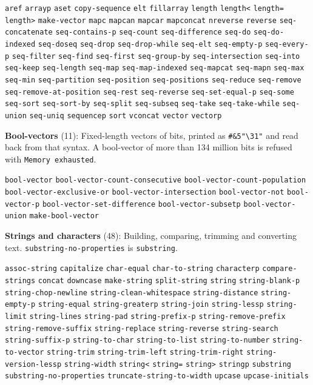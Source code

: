 \documentclass[11pt]{article}
\begin{document}
\texttt{aref} \texttt{arrayp} \texttt{aset} \texttt{copy-sequence} \texttt{elt} \texttt{fillarray} \texttt{length} \texttt{length<} \texttt{length=} \texttt{length>} \texttt{make-vector} \texttt{mapc} \texttt{mapcan} \texttt{mapcar} \texttt{mapconcat} \texttt{nreverse} \texttt{reverse} \texttt{seq-concatenate} \texttt{seq-contains-p} \texttt{seq-count} \texttt{seq-difference} \texttt{seq-do} \texttt{seq-do-indexed} \texttt{seq-doseq} \texttt{seq-drop} \texttt{seq-drop-while} \texttt{seq-elt} \texttt{seq-empty-p} \texttt{seq-every-p} \texttt{seq-filter} \texttt{seq-find} \texttt{seq-first} \texttt{seq-group-by} \texttt{seq-intersection} \texttt{seq-into} \texttt{seq-keep} \texttt{seq-length} \texttt{seq-map} \texttt{seq-map-indexed} \texttt{seq-mapcat} \texttt{seq-mapn} \texttt{seq-max} \texttt{seq-min} \texttt{seq-partition} \texttt{seq-position} \texttt{seq-positions} \texttt{seq-reduce} \texttt{seq-remove} \texttt{seq-remove-at-position} \texttt{seq-rest} \texttt{seq-reverse} \texttt{seq-set-equal-p} \texttt{seq-some} \texttt{seq-sort} \texttt{seq-sort-by} \texttt{seq-split} \texttt{seq-subseq} \texttt{seq-take} \texttt{seq-take-while} \texttt{seq-union} \texttt{seq-uniq} \texttt{sequencep} \texttt{sort} \texttt{vconcat} \texttt{vector} \texttt{vectorp}

\textbf{Bool-vectors} (11): Fixed-length vectors of bits, printed as \texttt{\#\&5"\textbackslash{}31"} and read back from that syntax. A bool-vector of more than 134 million bits is refused with \texttt{Memory exhausted}.

\texttt{bool-vector} \texttt{bool-vector-count-consecutive} \texttt{bool-vector-count-population} \texttt{bool-vector-exclusive-or} \texttt{bool-vector-intersection} \texttt{bool-vector-not} \texttt{bool-vector-p} \texttt{bool-vector-set-difference} \texttt{bool-vector-subsetp} \texttt{bool-vector-union} \texttt{make-bool-vector}

\textbf{Strings and characters} (48): Building, comparing, trimming and converting text. \texttt{substring-no-properties} is \texttt{substring}.

\texttt{assoc-string} \texttt{capitalize} \texttt{char-equal} \texttt{char-to-string} \texttt{characterp} \texttt{compare-strings} \texttt{concat} \texttt{downcase} \texttt{make-string} \texttt{split-string} \texttt{string} \texttt{string-blank-p} \texttt{string-chop-newline} \texttt{string-clean-whitespace} \texttt{string-distance} \texttt{string-empty-p} \texttt{string-equal} \texttt{string-greaterp} \texttt{string-join} \texttt{string-lessp} \texttt{string-limit} \texttt{string-lines} \texttt{string-pad} \texttt{string-prefix-p} \texttt{string-remove-prefix} \texttt{string-remove-suffix} \texttt{string-replace} \texttt{string-reverse} \texttt{string-search} \texttt{string-suffix-p} \texttt{string-to-char} \texttt{string-to-list} \texttt{string-to-number} \texttt{string-to-vector} \texttt{string-trim} \texttt{string-trim-left} \texttt{string-trim-right} \texttt{string-version-lessp} \texttt{string-width} \texttt{string<} \texttt{string=} \texttt{string>} \texttt{stringp} \texttt{substring} \texttt{substring-no-properties} \texttt{truncate-string-to-width} \texttt{upcase} \texttt{upcase-initials}
\end{document}
